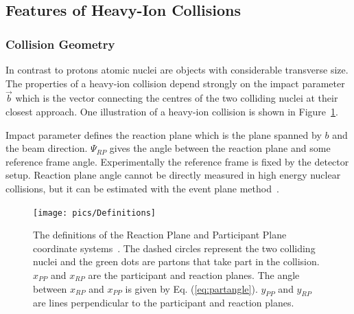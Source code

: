 \pagebreak
\FloatBarrier
\subsection{Features of Heavy-Ion Collisions}
\label{sec:features}
\subsubsection{Collision Geometry}
\label{sec:geometry}
In contrast to protons atomic nuclei are objects with considerable transverse size. The properties of a heavy-ion collision depend strongly on the impact parameter $\vec b$ which is the vector connecting the centres of the two colliding nuclei at their closest approach. One illustration of a heavy-ion collision is shown in Figure~\ref{fig:planes}.


Impact parameter defines the reaction plane which is the plane spanned by $b$ and the beam direction. $\Psi_{RP}$ gives the angle between the reaction plane and some reference frame angle. Experimentally the reference frame is fixed by the detector setup. Reaction plane angle cannot be directly measured in high energy nuclear collisions, but it can be estimated with the event plane method~\cite{Voloshin:2008dg}. 
\begin{figure}[h!]
\centering
%      

\texttt{[image: pics/Definitions]}
\caption[The definitions of the Reaction Plane and Participant Plane coordinate systems]{The definitions of the Reaction Plane and Participant Plane coordinate systems~\cite{Voloshin:2007pc}. The dashed circles represent the two colliding nuclei and the green dots are partons that take part  in the collision. $x_{PP}$ and $x_{RP}$ are the participant and reaction planes. The angle between $x_{RP}$ and $x_{PP}$ is given by Eq. (\ref{eq:partangle}). $y_{PP}$ and $y_{RP}$ are lines perpendicular to the participant and reaction planes. }
\label{fig:planes}
\end{figure}


